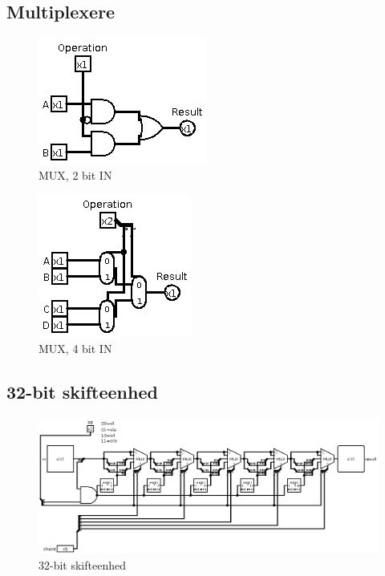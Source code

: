 \documentclass[10pt,a4paper,danish]{article}
\begin{document}
\subsection{Multiplexere}
\begin{figure}[htb]
\begin{center}
\leavevmode
\includegraphics[scale=0.70]{mux-2bit.png}
\end{center}
\caption{MUX, 2 bit IN}
\label{fig:mux2bit} 
\end{figure}

\begin{figure}[htb]
\begin{center}
\leavevmode
\includegraphics[scale=0.70]{mux-4bit.png}
\end{center}
\caption{MUX, 4 bit IN}
\label{fig:mux4bit} 
\end{figure}

\subsection{32-bit skifteenhed}
\begin{figure}[htb]
\begin{center}
\leavevmode
\includegraphics[scale=0.45]{circ3.png}
\end{center}
\caption{32-bit skifteenhed}
\label{fig:circ3}
\end{figure}
\end{document}
